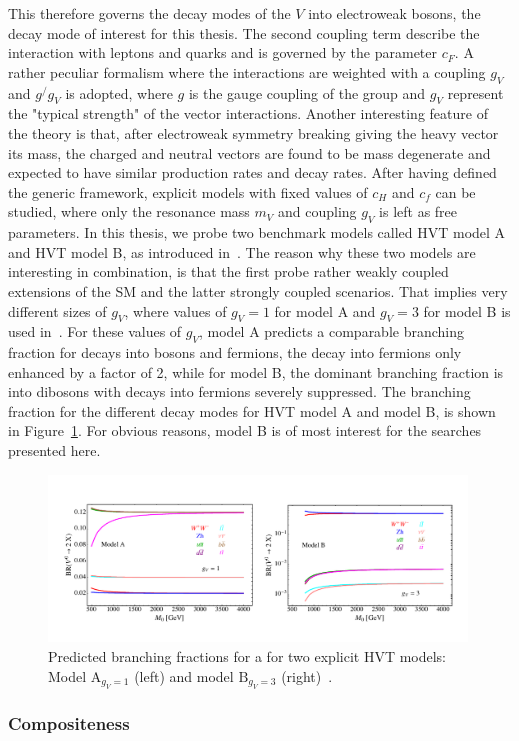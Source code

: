 This therefore governs the decay modes of the $V$ into electroweak bosons, the decay mode of interest for this thesis. The second coupling term describe the interaction with leptons and quarks and is governed by the parameter $c_F$. A rather peculiar formalism where the interactions are weighted with a coupling $g_V$ and $g^/g_V$ is adopted, where $g$ is the gauge coupling of the group and $g_V$ represent
the "typical strength" of the vector interactions. Another interesting feature of the theory is that, after electroweak symmetry breaking giving the heavy vector its mass, the charged and neutral vectors are found to be mass degenerate and expected to have similar production rates and decay rates.\newline
After having defined the generic framework, explicit models with fixed values of $c_H$ and $c_f$ can be studied, where only the resonance mass $m_V$ and coupling $g_V$ is left as free parameters.
In this thesis, we probe two benchmark models called HVT model A and HVT model B, as introduced in~\cite{Pappadopulo:2014qza}. The reason why these two models are interesting in combination, is that the first probe rather weakly coupled extensions of the SM and the latter strongly coupled scenarios. That implies very different sizes of $g_V$, where values of $g_V = 1$ for model A and $g_V = 3$ for model B is used in~\cite{Pappadopulo:2014qza}. For these values of $g_V$, model A predicts a comparable branching fraction for decays into bosons and fermions, the decay into fermions only enhanced by a factor of 2, while for model B, the dominant branching fraction is into dibosons with decays into fermions severely suppressed. The branching fraction for the different decay modes for HVT model A and model B, is shown in Figure~\ref{fig:theory:hvtBR}. For obvious reasons, model B is of most interest for the searches presented here.
\begin{figure}[h!]
\centering
\includegraphics[width=0.99\textwidth]{figures/theory/hvtmodels.pdf}
\caption{Predicted branching fractions for a \PZpr for two explicit HVT models: Model  $\mathrm{A}_{g_V=1}$ (left) and model $\mathrm{B}_{g_V=3}$ (right)~\cite{Pappadopulo:2014qza}.}
\label{fig:theory:hvtBR}
\end{figure}

\subsubsection{Compositeness}